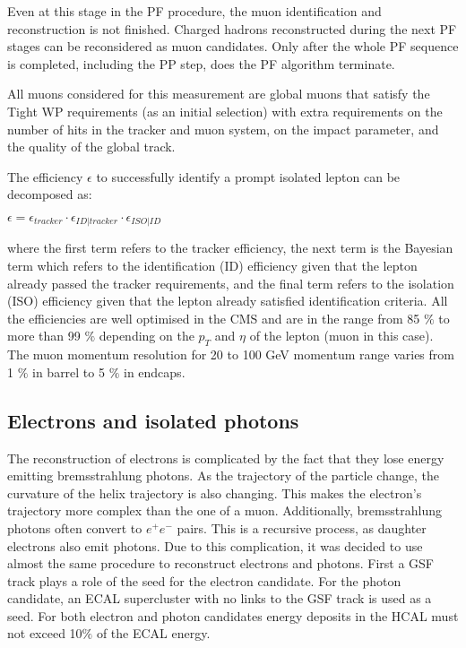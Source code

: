 Even at this stage in the PF procedure, the muon identification and reconstruction is not finished. Charged hadrons reconstructed during the next PF stages can be reconsidered as muon candidates. Only after the whole PF sequence is completed, including the PP step, does the PF algorithm terminate.

All muons considered for this measurement are global muons that satisfy the Tight WP requirements (as an initial selection) with extra requirements on the number of hits in the tracker and muon system, on the impact parameter, and the quality of the global track. 

The efficiency $\epsilon$ to successfully identify a prompt isolated lepton can be decomposed as:

$\epsilon = \epsilon_{tracker} \cdot \epsilon_{ID | tracker} \cdot \epsilon_{ISO | ID} $

\noindent where the first term refers to the tracker efficiency, the next term is the Bayesian term which refers to the identification (ID) efficiency given that the lepton already passed the tracker requirements, and the final term refers to the isolation (ISO) efficiency given that the lepton already satisfied identification criteria. All the efficiencies are well optimised in the CMS and are in the range from 85 $\%$ to more than 99 $\%$ depending on the $p_T$ and $\eta$ of the lepton (muon in this case). The muon momentum resolution for 20 to 100 GeV momentum range varies from 1 $\%$ in barrel to 5 $\%$ in endcaps.

\subsection{Electrons and isolated photons}\label{sec:electrons}

The reconstruction of electrons is complicated by the fact that they lose energy emitting bremsstrahlung photons. As the trajectory of the particle change, the curvature of the helix trajectory is also changing. This makes the electron's trajectory more complex than the one of a muon. Additionally, bremsstrahlung photons often convert to $e^+ e^-$ pairs. This is a recursive process, as daughter electrons also emit photons. Due to this complication, it was decided to use almost the same procedure to reconstruct electrons and photons. First a GSF track plays a role of the seed for the electron candidate. For the photon candidate, an ECAL supercluster with no links to the GSF track is used as a seed. For both electron and photon candidates energy deposits in the HCAL must not exceed 10$\%$ of the ECAL energy. 

